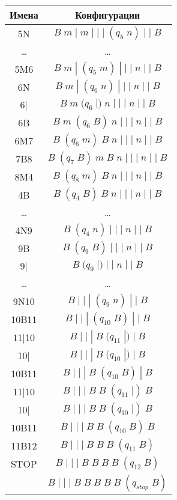 \documentclass[a4paper, 12pt]{article}  %
\theoremstyle{definition}
\begin{document}
\begin{multicols}{2}
		\begin{tabular}{ | c | c | }
			\hline
			Имена & Конфигурации \\ 
			\hline
			5N & $ B \;  m \;  | \;  m \; | \; | \; | \; (q_5 \; n) \; | \;  | \; B $ \\
			\dots & \dots \\
			5M6 & $ B \;  m \;  | \; (q_5 \; m) \; | \; | \; | \;  n \; | \;  | \; B $ \\
			6N & $ B \;  m \;  | \; (q_6 \; n) \; | \; | \; | \;  n \; | \;  | \; B $ \\
			6| & $ B \;  m \; (q_6 \; |) \;  n \; | \; | \; | \;  n \; | \;  | \; B $ \\
			6B & $ B \;  m \; (q_6 \; B) \;  n \; | \; | \; | \;  n \; | \;  | \; B $ \\
			6M7 & $ B \; (q_6 \; m) \;  B \;  n \; | \; | \; | \;  n \; | \;  | \; B $ \\
			7B8 & $ B \; (q_7 \; B) \; m \;  B \;  n \; | \; | \; | \;  n \; | \;  | \; B $ \\
			8M4 & $ B \; (q_8 \; m) \;  B \;  n \; | \; | \; | \;  n \; | \;  | \; B $ \\
			4B & $ B \; (q_4 \; B) \;  B \;  n \; | \; | \; | \;  n \; | \;  | \; B $ \\
			\dots & \dots \\
			4N9 & $  B \;  (q_4 \; n) \; | \; | \; | \;  n \; | \;  | \; B $ \\
			9B & $  B \;  (q_9 \; B) \; | \; | \; | \;  n \; | \;  | \; B $ \\
			9| & $  B \; (q_9 \; |) \; | \; | \;  n \; | \;  | \; B $ \\
			\dots & \dots \\
			9N10 & $  B \; | \; | \; | \;  (q_9 \; n) \; | \;  | \; B $ \\
			10B11 & $  B \; | \; | \; | \;  (q_{10} \; B) \; | \;  | \; B $ \\
			11|10 & $  B \; | \; | \; | \;  B \; (q_{11} \; |) \;  | \; B $ \\
			10| & $  B \; | \; | \; | \;  B \; (q_{10} \; |) \;  | \; B $ \\
			10B11 & $  B \; | \; | \; | \;  B \; (q_{10} \; B) \;  | \; B $ \\
			11|10 & $  B \; | \; | \; | \;  B \;  B \; (q_{11} \; |) \; B $ \\
			10| & $  B \; | \; | \; | \;  B \;  B \; (q_{10} \; |) \; B $ \\
			10B11 & $  B \; | \; | \; | \;  B \;  B \; (q_{10} \; B) \; B $ \\
			11B12 & $  B \; | \; | \; | \;  B \;  B \;  B \; (q_{11} \; B) $ \\
			STOP & $  B \; | \; | \; | \;  B \;  B \;  B \; B \; (q_{12} \; B) $ \\
			& $  B \; | \; | \; | \;  B \;  B \;  B \; B \; B \; (q_{stop} \; B) $ \\
			\hline
		\end{tabular}
	\end{multicols}
	
\end{document}
